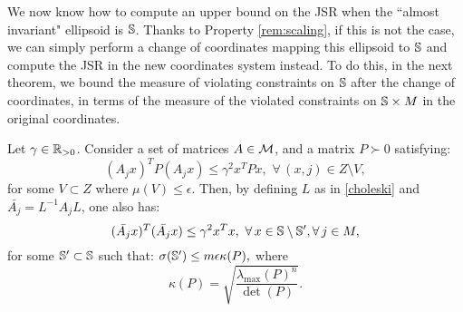%

We now know how to compute an upper bound on the JSR when the ``almost invariant" ellipsoid is $\mathbb{S}$. Thanks to Property \ref{rem:scaling}, if this is not the case, we can simply perform a change of coordinates mapping this ellipsoid to $\mathbb{S}$ and compute the JSR in the new coordinates system instead. To do this, in the next theorem, we bound the measure of violating constraints on $\mathbb{S}$ after the change of coordinates, in terms of the measure of the violated constraints on $\mathbb{S} \times M$ in the original coordinates.

\begin{proposition}\label{thm:mainTheorem01}Let $\gamma \in \mathbb{R}_{> 0}$. Consider a set of matrices $A \in \mathcal{M}$, and a matrix $P \succ 0$ satisfying:
\begin{equation}\label{eqn:P0}(A_j x)^TP(A_j x) \leq {\gamma}^2x^TPx,\,\, \forall\, (x, j) \in Z \setminus V,\end{equation}
for some $V \subset Z$ where $\mu(V) \leq \epsilon$. Then, by defining $L$ as in \eqref{choleski} and $\bar{A_j}=  L^{-1}A_jL$, one also has:
\begin{equation*}\label{eqn:thm01-2}(\bar{A_j} x)^T(\bar{A_j} x) \leq {\gamma}^2x^Tx,\,\, \forall\, x \in \mathbb{S} \setminus \mathbb{S}', \forall\, j \in M,\end{equation*}
for some $\mathbb{S}' \subset \mathbb{S}$ such that: $\sigma(\mathbb{S}') \leq m\epsilon \kappa(P),$
where $$\kappa(P) = \sqrt{\frac{\lambda_{\max}(P)^n}{\det(P)}}.$$
\end{proposition}

